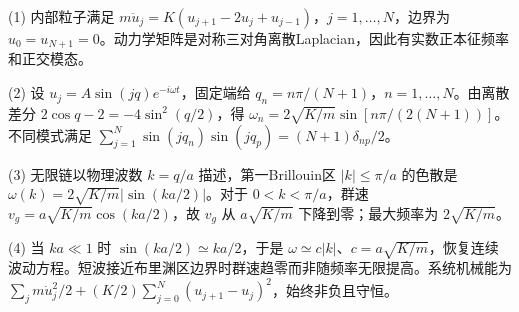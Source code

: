 (1) 内部粒子满足 \(m\ddot u_j=K(u_{j+1}-2u_j+u_{j-1})\)，\(j=1,\dots,N\)，边界为 \(u_0=u_{N+1}=0\)。动力学矩阵是对称三对角离散Laplacian，因此有实数正本征频率和正交模态。

(2) 设 \(u_j=A\sin(jq)e^{-i\omega t}\)，固定端给 \(q_n=n\pi/(N+1)\)，\(n=1,\dots,N\)。由离散差分 \(2\cos q-2=-4\sin^2(q/2)\)，得 \(\boxed{\omega_n=2\sqrt{K/m}\sin[n\pi/(2(N+1))]}\)。不同模式满足 \(\sum_{j=1}^N\sin(jq_n)\sin(jq_p)=(N+1)\delta_{np}/2\)。

(3) 无限链以物理波数 \(k=q/a\) 描述，第一Brillouin区 \(|k|\le\pi/a\) 的色散是 \(\omega(k)=2\sqrt{K/m}|\sin(ka/2)|\)。对于 \(0<k<\pi/a\)，群速 \(v_g=a\sqrt{K/m}\cos(ka/2)\)，故 \(v_g\) 从 \(a\sqrt{K/m}\) 下降到零；最大频率为 \(2\sqrt{K/m}\)。

(4) 当 \(ka\ll1\) 时 \(\sin(ka/2)\simeq ka/2\)，于是 \(\omega\simeq c|k|\)、\(c=a\sqrt{K/m}\)，恢复连续波动方程。短波接近布里渊区边界时群速趋零而非随频率无限提高。系统机械能为 \(\sum_j m\dot u_j^2/2+(K/2)\sum_{j=0}^N(u_{j+1}-u_j)^2\)，始终非负且守恒。
